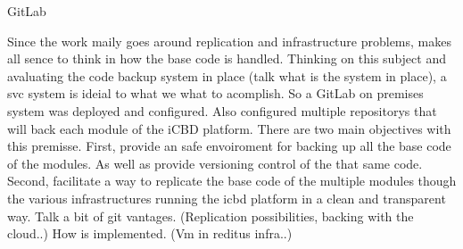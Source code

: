 GitLab

Since the work maily goes around replication and infrastructure problems, makes all sence to think in how the base code is handled. Thinking on this subject and avaluating the code backup system in place (talk what is the system in place), a svc system is ideial to what we what to acomplish.
So a GitLab on premises system was deployed and configured. Also configured multiple repositorys that will back each module of the iCBD platform.
There are two main objectives with this premisse.
First, provide an safe envoiroment for backing up all the base code of the modules. As well as provide versioning control of the that same code.
Second, facilitate a way to replicate the base code of the multiple modules though the various infrastructures running the icbd platform in a clean and transparent way.
Talk a bit of git vantages. (Replication possibilities, backing with the cloud..)
How is implemented. (Vm in reditus infra..)



